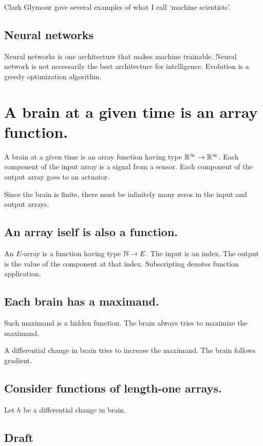 Clark Glymour gave several examples of what I call `machine scientists'.
\cite{GlyAutoDisc}

\section{Neural networks}

Neural networks is one architecture that makes machine trainable.
Neural network is not necessarily the best architecture for intelligence.
Evolution is a greedy optimization algorithm.

\chapter{A brain at a given time is an array function.}

A brain at a given time is an array function
having type \(\mathbb{R}^\infty \to \mathbb{R}^\infty\).
Each component of the input array is a signal from a sensor.
Each component of the output array goes to an actuator.

Since the brain is finite,
there must be infinitely many zeros in the input and output arrays.

\section{An array iself is also a function.}

An \(E\)-array is a function having type \(\mathbb{N} \to E\).
The input is an index.
The output is the value of the component at that index.
Subscripting denotes function application.

\section{Each brain has a maximand.}

Such maximand is a hidden function.
The brain always tries to maximize the maximand.

A differential change in brain tries to increase the maximand.
The brain follows gradient.

\section{Consider functions of length-one arrays.}

Let \(h\) be a differential change in brain.

\section{Draft}

